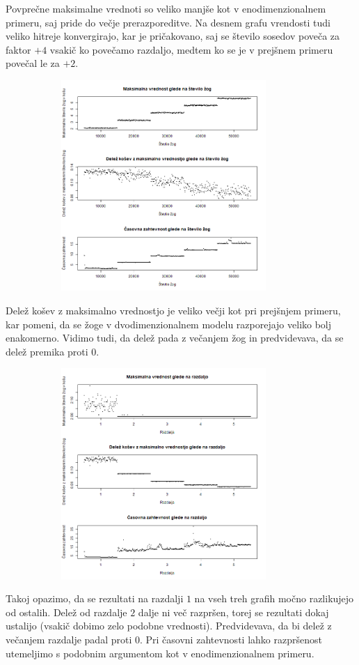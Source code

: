 \documentclass[a4paper, 11pt]{article}
\begin{document}
Povprečne maksimalne vrednoti so veliko manjše kot v enodimenzionalnem primeru, saj pride do večje prerazporeditve. Na desnem grafu vrendosti tudi veliko hitreje konvergirajo, kar je pričakovano, saj se število sosedov poveča za faktor $+4$ vsakič ko povečamo razdaljo, 
medtem ko se je v prejšnem primeru povečal le za $+2$.

\includegraphics[width=12cm, height= 8cm]{dim2_glede_na_stevilo_zog.png}

Delež košev z maksimalno vrednostjo je veliko večji kot pri prejšnjem primeru, kar pomeni, da se žoge v dvodimenzionalnem modelu razporejajo veliko bolj enakomerno. Vidimo tudi, da delež pada z večanjem žog in predvidevava, da se delež premika proti $0$.

\includegraphics[width=12cm, height= 8cm]{dim2_glede_na_razdaljo.png}

\pagebreak

Takoj opazimo, da se rezultati na razdalji $1$ na vseh treh grafih močno razlikujejo od ostalih. Delež od razdalje $2$ dalje ni več razpršen, torej se rezultati dokaj ustalijo (vsakič dobimo zelo podobne vrednosti). Predvidevava, da bi delež
z večanjem razdalje padal proti 0.
Pri časovni zahtevnosti lahko razpršenost utemeljimo s podobnim argumentom kot v enodimenzionalnem primeru.
\end{document}
